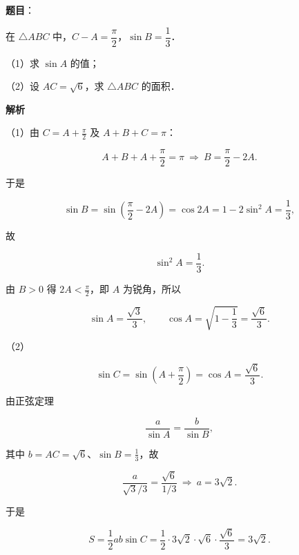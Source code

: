 \begin{answer}

\textbf{题目}：

在 $\triangle ABC$ 中，$C-A=\dfrac{\pi}{2}$，$\sin B=\dfrac13$．

（1）求 $\sin A$ 的值；

（2）设 $AC=\sqrt6$，求 $\triangle ABC$ 的面积．

\textbf{解析}

（1）由 $C=A+\frac\pi2$ 及 $A+B+C=\pi$：

\nopagebreak[4]
\[A+B+A+\frac\pi2=\pi\ \Longrightarrow\ B=\frac\pi2-2A .\]

于是

\nopagebreak[4]
\[\sin B=\sin\left(\frac\pi2-2A\right)=\cos2A=1-2\sin^2A=\frac13,\]

故

\nopagebreak[4]
\[\sin^2A=\frac13 .\]

由 $B>0$ 得 $2A<\frac\pi2$，即 $A$ 为锐角，所以

\nopagebreak[4]
\[\sin A=\frac{\sqrt3}{3},\qquad \cos A=\sqrt{1-\frac13}=\frac{\sqrt6}{3}.\]

（2）

\nopagebreak[4]
\[\sin C=\sin\left(A+\frac\pi2\right)=\cos A=\frac{\sqrt6}{3}.\]

由正弦定理

\nopagebreak[4]
\[\frac{a}{\sin A}=\frac{b}{\sin B},\]

其中 $b=AC=\sqrt6$、$\sin B=\frac13$，故

\nopagebreak[4]
\[\frac{a}{\sqrt3/3}=\frac{\sqrt6}{1/3}\ \Longrightarrow\ a=3\sqrt2 .\]

于是

\nopagebreak[4]
\[S=\frac12ab\sin C=\frac12\cdot3\sqrt2\cdot\sqrt6\cdot\frac{\sqrt6}{3}=3\sqrt2 .\]


\end{answer}
